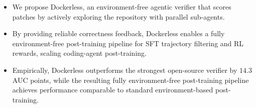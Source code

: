 \documentclass{llmxive}
\providecommand{\approach}{Dockerless\xspace}
\providecommand{\zeng}[1]{\textbf{[Zeng: #1]}}
\providecommand{\gu}[1]{\textbf{[Gu: #1]}}
\providecommand{\shi}[1]{\textbf{[Shi: #1]}}
\begin{document}
\begin{itemize}
  \item We propose \approach, an environment-free agentic verifier that scores patches by actively exploring the repository with parallel sub-agents.
  \item By providing reliable correctness feedback, \approach enables a fully environment-free post-training pipeline for SFT trajectory filtering and RL rewards, scaling coding-agent post-training.
  \item Empirically, \approach outperforms the strongest open-source verifier by $14.3$ AUC points, while the resulting fully environment-free post-training pipeline achieves performance comparable to standard environment-based post-training.
\end{itemize}
\end{document}
